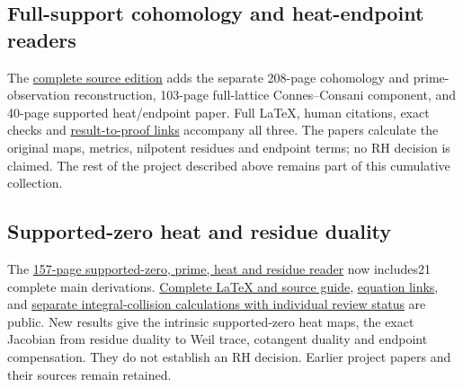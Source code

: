 \documentclass[
]{article}
\begin{document}
\subsection{Full-support cohomology and heat-endpoint
readers}\label{full-support-cohomology-and-heat-endpoint-readers}

The
\href{https://github.com/KokunoYumeto/zeta-function-research-reader/tree/main/workbenches/splitzero-tandem/continuations/20260923-cohomology-heat-residue}{complete
source edition} adds the separate 208-page cohomology and
prime-observation reconstruction, 103-page full-lattice Connes--Consani
component, and 40-page supported heat/endpoint paper. Full LaTeX, human
citations, exact checks and
\href{https://github.com/KokunoYumeto/zeta-function-research-reader/blob/main/workbenches/splitzero-tandem/continuations/20260923-cohomology-heat-residue/RESULTS_AND_PROOF_LINKS.json}{result-to-proof
links} accompany all three. The papers calculate the original maps,
metrics, nilpotent residues and endpoint terms; no RH decision is
claimed. The rest of the project described above remains part of this
cumulative collection.

\subsection{Supported-zero heat and residue
duality}\label{supported-zero-heat-and-residue-duality}

The
\href{https://github.com/KokunoYumeto/zeta-function-research-reader/blob/main/workbenches/splitzero-tandem/branches/tau-zero-prime-positivity/TAU_ZERO_PRIME_POSITIVITY.pdf}{157-page
supported-zero, prime, heat and residue reader} now includes21 complete
main derivations.
\href{https://github.com/KokunoYumeto/zeta-function-research-reader/blob/main/workbenches/splitzero-tandem/branches/tau-zero-prime-positivity/PUBLICATION_COMPANION.md}{Complete
LaTeX and source guide},
\href{https://github.com/KokunoYumeto/zeta-function-research-reader/blob/main/workbenches/splitzero-tandem/branches/tau-zero-prime-positivity/PUBLICATION_INDEX.json}{equation
links}, and
\href{https://github.com/KokunoYumeto/zeta-function-research-reader/blob/main/workbenches/splitzero-tandem/branches/tau-zero-prime-positivity/research_calculations/STATUS.json}{separate
integral-collision calculations with individual review status} are
public. New results give the intrinsic supported-zero heat maps, the
exact Jacobian from residue duality to Weil trace, cotangent duality and
endpoint compensation. They do not establish an RH decision. Earlier
project papers and their sources remain retained.
\end{document}
